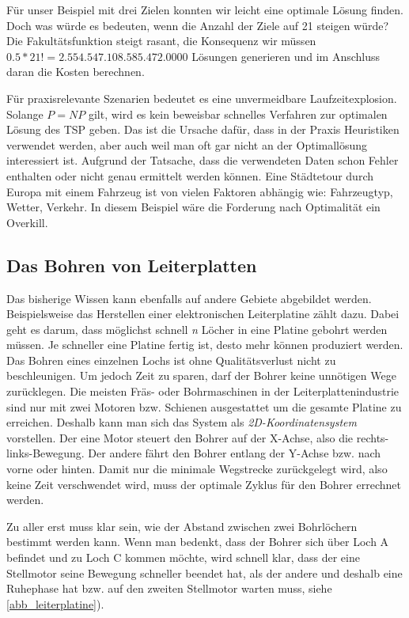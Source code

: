 \documentclass{article}
\begin{document}
Für unser Beispiel mit drei Zielen konnten wir leicht eine optimale Lösung finden. Doch was würde es bedeuten, wenn die Anzahl der Ziele auf 21 steigen würde? Die Fakultätsfunktion steigt rasant, die Konsequenz wir müssen $0.5 * 21! = 2.554.547.108.585.472.0000$ Lösungen generieren und im Anschluss daran die Kosten berechnen.

Für praxisrelevante Szenarien bedeutet es eine unvermeidbare Laufzeitexplosion. Solange $P = NP$ gilt, wird es kein beweisbar schnelles Verfahren zur optimalen Lösung des TSP geben. Das ist die Ursache dafür, dass in der Praxis Heuristiken verwendet werden, aber auch weil man oft gar nicht an der Optimallösung interessiert ist. Aufgrund der Tatsache, dass die verwendeten Daten schon Fehler enthalten oder nicht genau ermittelt werden können. Eine Städtetour durch Europa mit einem Fahrzeug ist von vielen Faktoren abhängig wie: Fahrzeugtyp, Wetter, Verkehr. In diesem Beispiel wäre die Forderung nach Optimalität ein Overkill.


\subsection{Das Bohren von Leiterplatten}

Das bisherige Wissen kann ebenfalls auf andere Gebiete abgebildet werden. Beispielsweise das Herstellen einer elektronischen Leiterplatine zählt dazu. Dabei geht es darum, dass möglichst schnell \textit{n} Löcher in eine Platine gebohrt werden müssen. Je schneller eine Platine fertig ist, desto mehr können produziert werden. Das Bohren eines einzelnen Lochs ist ohne Qualitätsverlust nicht zu beschleunigen. Um jedoch Zeit zu sparen, darf der Bohrer keine unnötigen Wege zurücklegen. Die meisten Fräs- oder Bohrmaschinen in der Leiterplattenindustrie sind nur mit zwei Motoren bzw. Schienen ausgestattet um die gesamte Platine zu erreichen. Deshalb kann man sich das System als \textit{2D-Koordinatensystem} vorstellen. Der eine Motor steuert den Bohrer auf der X-Achse, also die rechts-links-Bewegung. Der andere fährt den Bohrer entlang der Y-Achse bzw. nach vorne oder hinten. Damit nur die minimale Wegstrecke zurückgelegt wird, also keine Zeit verschwendet wird, muss der optimale Zyklus für den Bohrer errechnet werden.

Zu aller erst muss klar sein, wie der Abstand zwischen zwei Bohrlöchern bestimmt werden kann. Wenn man bedenkt, dass der Bohrer sich über Loch A befindet und zu Loch C kommen möchte, wird schnell klar, dass der eine Stellmotor seine Bewegung schneller beendet hat, als der andere und deshalb eine Ruhephase hat bzw. auf den zweiten Stellmotor warten muss, siehe  \autoref{abb_leiterplatine}).
\end{document}

